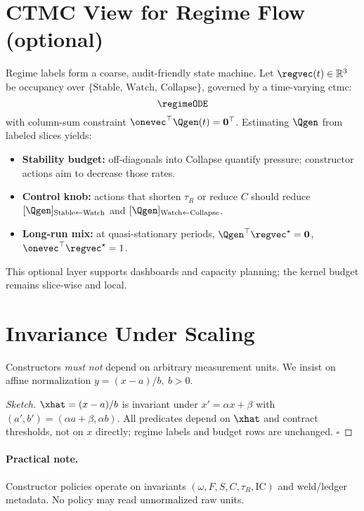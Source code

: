 \section{CTMC View for Regime Flow (optional)}
\label{sec:ctmc}
Regime labels form a coarse, audit-friendly state machine. Let \(\regvec(t)\in\mathbb{R}^3\) be occupancy over \(\{\text{Stable, Watch, Collapse}\}\), governed by a time-varying \gls{ctmc}:
\[
\regimeODE
\]
with column-sum constraint \(\onevec^\top \Qgen(t)=\mathbf{0}^\top\).
Estimating \(\Qgen\) from labeled slices yields:
\begin{itemize}[leftmargin=1.25em]
  \item \textbf{Stability budget:} off-diagonals into Collapse quantify pressure; constructor actions aim to decrease those rates.
  \item \textbf{Control knob:} actions that shorten \(\tau_{R}\) or reduce \(C\) should reduce \([\Qgen]_{\text{Stable}\leftarrow\text{Watch}}\) and \([\Qgen]_{\text{Watch}\leftarrow\text{Collapse}}\).
  \item \textbf{Long-run mix:} at quasi-stationary periods, \(\Qgen^\top \regvec^\star=\mathbf{0}\), \(\onevec^\top\regvec^\star=1\).
\end{itemize}
This optional layer supports dashboards and capacity planning; the kernel budget remains slice-wise and local.

\section{Invariance Under Scaling}
\label{sec:scale}
Constructors \emph{must not} depend on arbitrary measurement units. We insist on affine normalization \(y=(x-a)/b,\ b>0\).

\begin{lemma}
\affineInvariance
\end{lemma}

\begin{proof}[Sketch]
\(\xhat=(x-a)/b\) is invariant under \(x'=\alpha x+\beta\) with \((a',b')=(\alpha a+\beta,\alpha b)\).
All predicates depend on \(\xhat\) and contract thresholds, not on \(x\) directly; regime labels and budget rows are unchanged. \(\square\)
\end{proof}

\paragraph{Practical note.}
Constructor policies operate on invariants \((\omega,F,S,C,\tau_{R},\mathrm{IC})\) and weld/ledger metadata. No policy may read unnormalized raw units.

